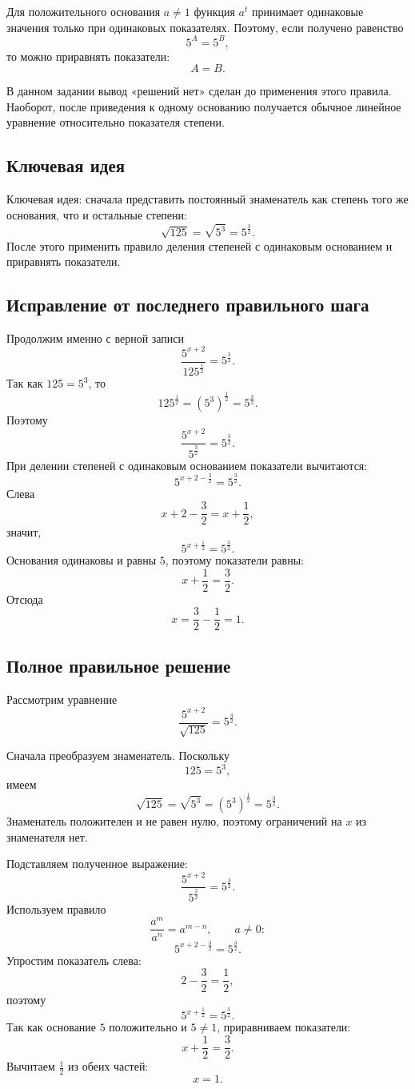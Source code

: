 \documentclass[12pt,a4paper]{article}
\begin{document}
Для положительного основания $a\ne1$ функция $a^t$ принимает одинаковые значения только при одинаковых показателях. Поэтому, если получено равенство
\[
5^A=5^B,
\]
то можно приравнять показатели:
\[
A=B.
\]

В данном задании вывод «решений нет» сделан до применения этого правила. Наоборот, после приведения к одному основанию получается обычное линейное уравнение относительно показателя степени.

\subsection*{Ключевая идея}
\textcolor{blue!60!black}{Ключевая идея:} сначала представить постоянный знаменатель как степень того же основания, что и остальные степени:
\[
\sqrt{125}=\sqrt{5^3}=5^{\frac32}.
\]
После этого применить правило деления степеней с одинаковым основанием и приравнять показатели.

\subsection*{Исправление от последнего правильного шага}
Продолжим именно с верной записи
\[
\frac{5^{x+2}}{125^{\frac12}}=5^{\frac32}.
\]
Так как $125=5^3$, то
\[
125^{\frac12}=(5^3)^{\frac12}=5^{\frac32}.
\]
Поэтому
\[
\frac{5^{x+2}}{5^{\frac32}}=5^{\frac32}.
\]
При делении степеней с одинаковым основанием показатели вычитаются:
\[
5^{x+2-\frac32}=5^{\frac32}.
\]
Слева
\[
x+2-\frac32=x+\frac12,
\]
значит,
\[
5^{x+\frac12}=5^{\frac32}.
\]
Основания одинаковы и равны $5$, поэтому показатели равны:
\[
x+\frac12=\frac32.
\]
Отсюда
\[
x=\frac32-\frac12=1.
\]

\subsection*{Полное правильное решение}
Рассмотрим уравнение
\[
\frac{5^{x+2}}{\sqrt{125}}=5^{\frac32}.
\]

Сначала преобразуем знаменатель. Поскольку
\[
125=5^3,
\]
имеем
\[
\sqrt{125}=\sqrt{5^3}=(5^3)^{\frac12}=5^{\frac32}.
\]
Знаменатель положителен и не равен нулю, поэтому ограничений на $x$ из знаменателя нет.

Подставляем полученное выражение:
\[
\frac{5^{x+2}}{5^{\frac32}}=5^{\frac32}.
\]
Используем правило
\[
\frac{a^m}{a^n}=a^{m-n},\qquad a\ne0:
\]
\[
5^{x+2-\frac32}=5^{\frac32}.
\]
Упростим показатель слева:
\[
2-\frac32=\frac12,
\]
поэтому
\[
5^{x+\frac12}=5^{\frac32}.
\]
Так как основание $5$ положительно и $5\ne1$, приравниваем показатели:
\[
x+\frac12=\frac32.
\]
Вычитаем $\frac12$ из обеих частей:
\[
x=1.
\]
\end{document}
